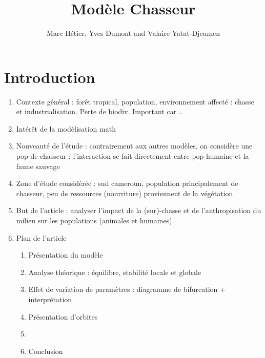 \documentclass{article}
\title{Modèle Chasseur}
\author{Marc Hétier, Yves Dumont  and Valaire Yatat-Djeumen}
\newcommand{\marc}[1]{\textcolor{teal}{#1}}
\newcommand{\YD}[1]{\textcolor{magenta}{#1}}
\begin{document}
\maketitle

\section{Introduction}

\begin{enumerate}
\item Contexte général : forêt tropical, population, environnement affecté : chasse et industrialisation. Perte de biodiv. Important car ..
\item  Intérêt de la modèlisation math
\item Nouveauté de l'étude : contrairement aux autres modèles, on considère une pop de chasseur : l'interaction se fait directement entre pop humaine et la faune sauvage
\item Zone d'étude considérée : sud cameroun, population principalement de chasseur, peu de ressources (nourriture) proviennent de la végétation
\item But de l'article : analyser l'impact de la (sur)-chasse et de l'anthropisation du milieu sur les populations (animales et humaines)
\item Plan de l'article

\begin{enumerate}
\item Présentation du modèle
\item Analyse théorique : équilibre, stabilité locale et globale
\item Effet de variation de paramètres : diagramme de bifurcation + interprétation
\item Présentation d'orbites
\item 
\item Conclusion
\end{enumerate}
\end{enumerate}
\end{document}
